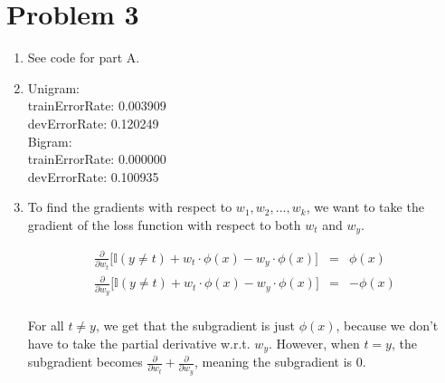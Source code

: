 \documentclass[12pt]{article}
\begin{document}
\section*{Problem 3}

\begin{enumerate}[label=(\alph*)]
  \item See code for part A.

  \item 
	Unigram:\\
	trainErrorRate: 0.003909\\
devErrorRate: 0.120249\\
  Bigram:\\
  trainErrorRate: 0.000000\\
devErrorRate: 0.100935\\
\item To find the gradients with respect to $w_1, w_2, ..., w_k$, we want to take the gradient of the loss function with respect to both $w_t$ and $w_y$. 

\begin{eqnarray*}
\frac{\partial}{\partial w_t} \biggl[\mathbb{I}(y \neq t) + w_{t} \cdot \phi(x) - w_{y} \cdot \phi(x) \biggr] &=& \phi(x)\\
\frac{\partial}{\partial w_y} \biggl[\mathbb{I}(y \neq t) + w_{t} \cdot \phi(x) - w_{y} \cdot \phi(x) \biggr] &=& -\phi(x)\\
\end{eqnarray*}

For all $t \ne y$, we get that the subgradient is just $\phi(x)$, because we don't have to take the partial derivative w.r.t. $w_y$. However, when $t = y$, the subgradient becomes $\frac{\partial}{\partial w_t} + \frac{\partial}{\partial w_y}$, meaning the subgradient is $0$.

\end{enumerate}
\end{document}
